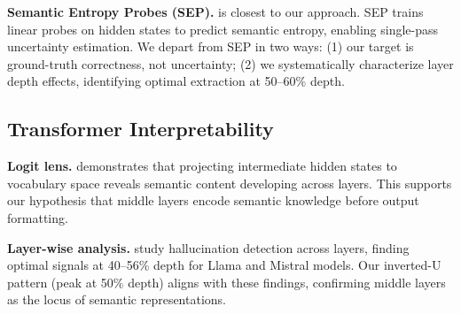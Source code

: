 \textbf{Semantic Entropy Probes (SEP).} \citet{kossen2024semantic} is closest to our approach. SEP trains linear probes on hidden states to predict semantic entropy, enabling single-pass uncertainty estimation. We depart from SEP in two ways: (1) our target is ground-truth correctness, not uncertainty; (2) we systematically characterize layer depth effects, identifying optimal extraction at 50--60\% depth.

\subsection{Transformer Interpretability}

\textbf{Logit lens.} \citet{nostalgebraist2020logit} demonstrates that projecting intermediate hidden states to vocabulary space reveals semantic content developing across layers. This supports our hypothesis that middle layers encode semantic knowledge before output formatting.

\textbf{Layer-wise analysis.} \citet{aiersilan2026hallucination} study hallucination detection across layers, finding optimal signals at 40--56\% depth for Llama and Mistral models. Our inverted-U pattern (peak at 50\% depth) aligns with these findings, confirming middle layers as the locus of semantic representations.
